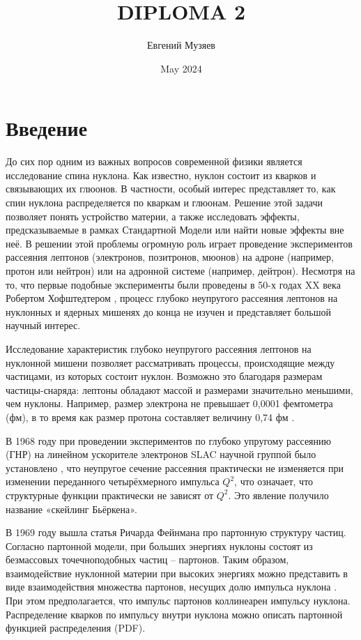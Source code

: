 \documentclass{extreport}
\title{DIPLOMA 2}
\author{Евгений Музяев}
\date{May 2024}
\begin{document}



\newpage
\tableofcontents
\setcounter{page}{4}
\thispagestyle{headings}
\newpage


\chapter*{Введение}

До сих пор одним из важных вопросов современной физики является исследование спина нуклона. Как известно, нуклон состоит из кварков и связывающих их глюонов. В частности, особый интерес представляет то, как спин нуклона распределяется по кваркам и глюонам. Решение этой задачи позволяет понять устройство материи, а также исследовать эффекты, предсказываемые в рамках Стандартной Модели или найти новые эффекты вне неё. В решении этой проблемы огромную роль играет проведение экспериментов рассеяния лептонов (электронов, позитронов, мюонов) на адроне (например, протон или нейтрон) или на адронной системе (например, дейтрон). Несмотря на то, что первые подобные эксперименты были проведены в 50-х годах XX века Робертом Хофштедтером \cite{Hofstadter}, процесс глубоко неупругого рассеяния лептонов на нуклонных и ядерных мишенях до конца не изучен и представляет большой научный интерес.


Исследование характеристик глубоко неупругого рассеяния лептонов на нуклонной мишени позволяет рассматривать процессы, происходящие между частицами, из которых состоит нуклон. Возможно это благодаря размерам частицы-снаряда: лептоны обладают массой и размерами значительно меньшими, чем нуклоны. Например, размер электрона не превышает 0,0001 фемтометра (фм), в то время как размер протона составляет величину 0,74 фм \cite{Hofstadter}.


В 1968 году при проведении экспериментов по глубоко упругому рассеянию (ГНР) на линейном ускорителе электронов SLAC научной группой было установлено \cite{SLAC}, что неупругое сечение рассеяния практически не изменяется при изменении переданного четырёхмерного импульса $Q^2$, что означает, что структурные функции практически не зависят от $Q^2$. Это явление получило название «скейлинг Бьёркена».


В 1969 году вышла статья Ричарда Фейнмана про партонную структуру частиц. Согласно партонной модели, при больших энергиях нуклоны состоят из безмассовых точечноподобных частиц – партонов. Таким образом, взаимодействие нуклонной материи при высоких энергиях можно представить в виде взаимодействия множества партонов, несущих долю импульса нуклона \cite{Feynman}. При этом предполагается, что импульс партонов коллинеарен импульсу нуклона. Распределение кварков по импульсу внутри нуклона можно описать партонной функцией распределения (PDF).
\end{document}
